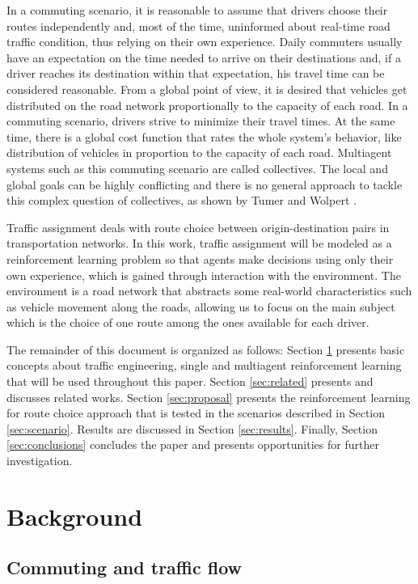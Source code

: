 \documentclass{RITA}
\begin{document}
In a commuting scenario, it is reasonable to assume that drivers choose their routes independently and, most of the time, uninformed about real-time road traffic condition, thus relying on their own experience. Daily commuters usually have an expectation on the time needed to arrive on their destinations and, if a driver reaches its destination within that expectation, his travel time can be considered  reasonable. From a global point of view, it is desired that vehicles get distributed on the road network proportionally to the capacity of each road. In a commuting scenario, drivers strive to minimize their travel times. At the same time, there is a global cost function that rates the whole system's behavior, like distribution of vehicles in proportion to the capacity of each road. Multiagent systems such as this commuting scenario are called collectives. The local and global goals can be highly conflicting and there is no general approach to tackle this complex question of collectives, as shown by Tumer and Wolpert \cite{Tumer&Wolpert2004}.

Traffic assignment deals with route choice between origin-destination pairs in transportation networks. In this work, traffic assignment will be modeled as a reinforcement learning problem so that agents make decisions using only their own experience, which is gained through interaction with the environment. The environment is a road network that abstracts some real-world characteristics such as vehicle movement along the roads, allowing us to focus on the main subject which is the choice of one route among the ones available for each driver.

The remainder of this document is organized as follows: Section \ref{sec:concepts} presents basic concepts about traffic engineering, single and multiagent reinforcement learning that will be used throughout this paper. Section \ref{sec:related} presents and discusses related works. Section \ref{sec:proposal} presents the reinforcement learning for route choice approach that is tested in the scenarios described in Section \ref{sec:scenario}. Results are discussed in Section \ref{sec:results}. Finally, Section \ref{sec:conclusions} concludes the paper and presents opportunities for further investigation.

\section{Background}
\label{sec:concepts}
\subsection{Commuting and traffic flow}
\end{document}
